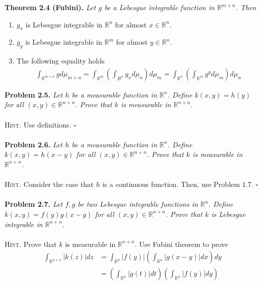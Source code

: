 \documentclass[a4paper]{article}
\numberwithin{equation}{section}
\begin{document}
\textbf{Theorem 2.4 (Fubini).} \textit{Let $g$ be a Lebesgue integrable function in $\mathbb{R}^{m+n}$. Then}
\begin{enumerate}
\item $g_x$ is Lebesgue integrable in $\mathbb{R}^n$ for almost $x\in \mathbb{R}^n$.
\item $g_y$ is Lebesgue integrable in $\mathbb{R}^m$ for almost $y \in \mathbb{R}^n$.
\item The following equality holds
\begin{align}
\int_{{\mathbb{R}^{m + n}}} {gd{\mu _{m + n}}}  = \int_{{\mathbb{R}^m}} {\left( {\int_{{R^n}} {{g_x}d{\mu _n}} } \right)d{\mu _m}}  = \int_{{\mathbb{R}^n}} {\left( {\int_{{\mathbb{R}^m}} {{g^y}d{\mu _m}} } \right)d{\mu _n}} 
\end{align}
\end{enumerate}
\textbf{Problem 2.5.} \textit{Let $h$ be a measurable function in $\mathbb{R}^n$. Define $k\left(x,y\right)=h\left(y\right)$ for all $\left(x,y\right) \in \mathbb{R}^{n+n}$. Prove that $k$ is measurable in $\mathbb{R}^{n+n}$.}\\
\\
\textsc{Hint.} Use definitions. \hfill $\square$\\
\\
\textbf{Problem 2.6.} \textit{Let $h$ be a measurable function in $\mathbb{R}^n$. Define $k\left(x,y\right)=h\left(x-y\right)$ for all $\left(x,y\right) \in \mathbb{R}^{n+n}$. Prove that $k$ is measurable in $\mathbb{R}^{n+n}$.}\\
\\
\textsc{Hint.} Consider the case that $h$ is a continuous function. Then, use Problem 1.7. \hfill $\square$\\
\\
\textbf{Problem 2.7.} \textit{Let $f,g$ be two Lebesgue integrable functions in $\mathbb{R}^n$. Define $k\left(x,y\right)=f\left(y\right)g\left(x-y\right)$ for all $\left(x,y\right) \in \mathbb{R}^{n+n}$. Prove that $k$ is Lebesgue integrable in $\mathbb{R}^{n+n}$.}\\
\\
\textsc{Hint.} Prove that $k$ is measurable in $\mathbb{R}^{n+n}$. Use Fubini theorem to prove
\begin{align}
\int_{{\mathbb{R}^{n + n}}} {\left| {k\left( z \right)} \right|dz}  &= \int_{{\mathbb{R}^n}} {\left| {f\left( y \right)} \right|\left( {\int_{{\mathbb{R}^n}} {\left| {g\left( {x - y} \right)} \right|dx} } \right)dy} \\
 &= \left( {\int_{{\mathbb{R}^n}} {\left| {g\left( t \right)} \right|dt} } \right)\left( {\int_{{\mathbb{R}^n}} {\left| {f\left( y \right)} \right|dy} } \right)
\end{align}
\end{document}
